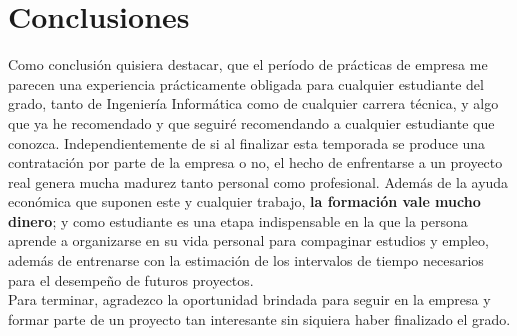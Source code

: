		
	
	\newpage
	
	\part{Conclusiones}
	
		Como conclusión quisiera destacar, que el período de prácticas de empresa me parecen una experiencia prácticamente obligada para cualquier estudiante del grado, tanto de Ingeniería Informática como de cualquier carrera técnica, y algo que ya he recomendado y que seguiré recomendando a cualquier estudiante que conozca. Independientemente de si al finalizar esta temporada se produce una contratación por parte de la empresa o no, el hecho de enfrentarse a un proyecto real genera mucha madurez tanto personal como profesional. Además de la ayuda económica que suponen este y cualquier trabajo, \textbf{la formación vale mucho dinero}; y como estudiante es una etapa indispensable en la que la persona aprende a organizarse en su vida personal para compaginar estudios y empleo, además de entrenarse con la estimación de los intervalos de tiempo necesarios para el desempeño de futuros proyectos.\\
		
		Para terminar, agradezco la oportunidad brindada para seguir en la empresa y formar parte de un proyecto tan interesante sin siquiera haber finalizado el grado.
	
		\newpage


